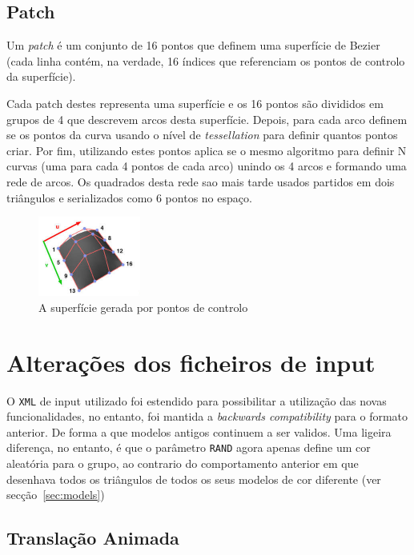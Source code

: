 \documentclass[a4paper]{article}
\begin{document}
\subsection{Patch}

Um \textit{patch} é um conjunto de 16 pontos que definem uma superfície de Bezier (cada linha contém, na verdade, 16 índices que referenciam os pontos de controlo da superfície).

Cada patch destes representa uma superfície e os 16 pontos são divididos em grupos de 4 que descrevem arcos desta superfície. Depois, para cada arco definem se os pontos da curva usando o nível de \textit{tessellation} para definir quantos pontos criar. Por fim, utilizando estes pontos aplica se o mesmo algoritmo para definir N curvas (uma para cada 4 pontos de cada arco) unindo os 4 arcos e formando uma rede de arcos. Os quadrados desta rede sao mais tarde usados partidos em dois triângulos e serializados como 6 pontos no espaço.

\begin{figure}[H]
    \centering
    \includegraphics[width=0.3\textwidth]{bezier.jpg}
    \caption{A superfície gerada por pontos de controlo}
\end{figure}

\section{Alterações dos ficheiros de input}\label{sec:estrutura-ficheiros}

O \texttt{XML} de input utilizado foi estendido para possibilitar a utilização das novas funcionalidades, no entanto, foi mantida a \textit{backwards compatibility} para o formato anterior. De forma a que modelos antigos continuem a ser validos. Uma ligeira diferença, no entanto, é que o parâmetro \texttt{RAND} agora apenas define um cor aleatória para o grupo, ao contrario do comportamento anterior em que desenhava todos os triângulos de todos os seus modelos de cor diferente (ver secção~\ref{sec:models})

\subsection{Translação Animada}
\end{document}
